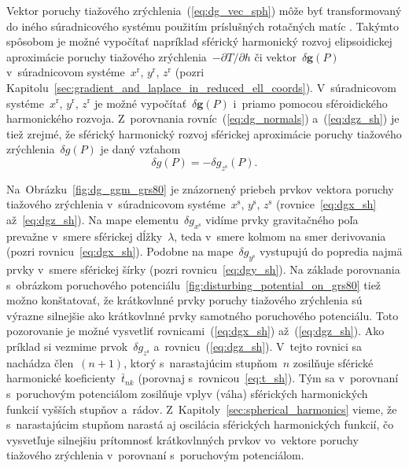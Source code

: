 \documentclass[a4paper,12pt]{book}
\let\vec\mathbf
\begin{document}
Vektor poruchy tiažového zrýchlenia~(\ref{eq:dg_vec_sph}) môže byť 
transformovaný do iného súradnicového systému použitím príslušných rotačných 
matíc \parencite[pozri napríklad][]{WGS84}.  Takýmto spôsobom je možné 
vypočítať napríklad sférický harmonický rozvoj elipsoidickej aproximácie 
poruchy tiažového zrýchlenia~$-\partial T \slash \partial h$ či vektor~$\delta 
\vec g(P)$ v~súradnicovom systéme~$x^\mathrm{r}$, $y^\mathrm{r}$, 
$z^\mathrm{r}$ (pozri 
Kapitolu~\ref{sec:gradient_and_laplace_in_reduced_ell_coords}).  V~súradnicovom 
systéme~$x^\mathrm{r}$, $y^\mathrm{r}$, $z^\mathrm{r}$ je možné 
vypočítať~$\delta \vec g(P)$ i~priamo pomocou sféroidického harmonického 
rozvoja.  Z~porovnania rovníc~(\ref{eq:dg_normals}) a~(\ref{eq:dgz_sh}) je tiež 
zrejmé, že sférický harmonický rozvoj sférickej aproximácie poruchy tiažového 
zrýchlenia~$\delta g(P)$ je daný vzťahom
%
\begin{equation}
\label{eq:dg_sh_sa}
\delta g(P) = -\delta g_{z^\mathrm{s}}(P){.}
\end{equation}

Na~Obrázku~\ref{fig:dg_ggm_grs80} je znázornený priebeh prvkov vektora poruchy 
tiažového zrýchlenia v~súradnicovom systéme~$x^\mathrm{s}$, $y^\mathrm{s}$, 
$z^\mathrm{s}$ (rovnice~\ref{eq:dgx_sh} až~\ref{eq:dgz_sh}).  Na mape 
elementu~$\delta g_{x^\mathrm{s}}$ vidíme prvky gravitačného poľa prevažne 
v~smere sférickej dĺžky~$\lambda$, teda v~smere kolmom na smer derivovania 
(pozri rovnicu~\ref{eq:dgx_sh}).  Podobne na mape~$\delta g_{y^\mathrm{s}}$ 
vystupujú do popredia najmä prvky v~smere sférickej šírky (pozri 
rovnicu~\ref{eq:dgy_sh}).  Na základe porovnania s~obrázkom poruchového 
potenciálu~\ref{fig:disturbing_potential_on_grs80} tiež možno konštatovať, že 
krátkovlnné prvky poruchy tiažového zrýchlenia sú výrazne silnejšie ako 
krátkovlnné prvky samotného poruchového potenciálu.  Toto pozorovanie je možné 
vysvetliť rovnicami~(\ref{eq:dgx_sh}) až~(\ref{eq:dgz_sh}).  Ako príklad si 
vezmime prvok~$\delta g_{z^\mathrm{s}}$ a~rovnicu~(\ref{eq:dgz_sh}).  V~tejto 
rovnici sa nachádza člen~$(n + 1)$, ktorý s~narastajúcim stupňom~$n$ zosilňuje 
sférické harmonické koeficienty~$\bar{t}_{nk}$ (porovnaj 
s~rovnicou~\ref{eq:t_sh}).  Tým sa v~porovnaní s~poruchovým potenciálom 
zosilňuje vplyv (váha) sférických harmonických funkcií vyšších stupňov a~rádov.  
Z~Kapitoly~\ref{sec:spherical_harmonics} vieme, že s~narastajúcim stupňom 
narastá aj oscilácia sférických harmonických funkcií, čo vysvetľuje silnejšiu 
prítomnosť krátkovlnných prvkov vo~vektore poruchy tiažového zrýchlenia 
v~porovnaní s~poruchovým potenciálom.
\end{document}
